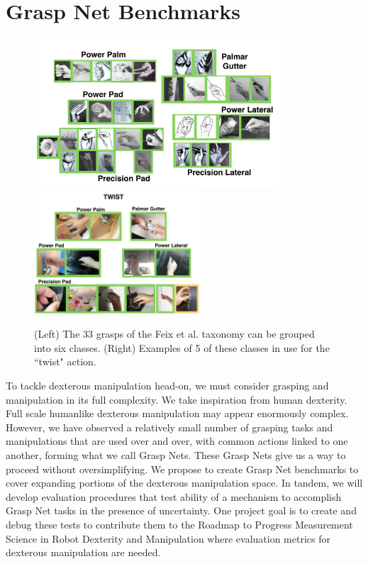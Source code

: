 \section{Grasp Net Benchmarks}   
    \label{secGraspNet}
 
\begin{figure}
\begin{center}
{\includegraphics[height=2.2in]{./figs/sixGraspTypes.png}}
{\includegraphics[height=1.8in]{./figs/twistGraspTypes.png}}
\end{center}
\vspace*{-0.2in}
\caption[]{\small (Left) The 33 grasps of the Feix et al. taxonomy \cite{feixgrasp} can be grouped into six classes. (Right) Examples of 5 of these classes in use for the ``twist" action.}
\label{GraspNet}
\end{figure}

To tackle dexterous manipulation head-on, we must consider grasping and manipulation in its full complexity.   We take inspiration from human dexterity.   Full scale humanlike dexterous manipulation may appear enormously complex.   However,  we have observed a relatively small number of grasping tasks and manipulations that are used over and over, with common actions linked to one another, forming what we call Grasp Nets.   These Grasp Nets give us a way to proceed without oversimplifying.  We propose to create Grasp Net benchmarks to cover expanding portions of the dexterous manipulation space.   In tandem, we will develop evaluation procedures that test ability of a mechanism to accomplish Grasp Net tasks in the presence of uncertainty.   One project goal is to create and debug these tests to contribute them to the Roadmap to Progress Measurement Science in Robot Dexterity and Manipulation \cite{falco2014roadmap} where evaluation metrics for dexterous manipulation are needed.   

